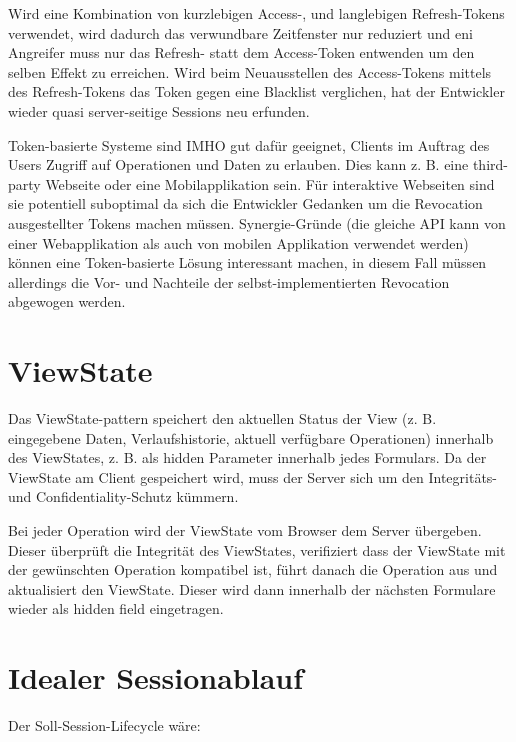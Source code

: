 Wird eine Kombination von kurzlebigen Access-, und langlebigen Refresh-Tokens verwendet, wird dadurch das verwundbare Zeitfenster nur reduziert und eni Angreifer muss nur das Refresh- statt dem Access-Token entwenden um den selben Effekt zu erreichen. Wird beim Neuausstellen des Access-Tokens mittels des Refresh-Tokens das Token gegen eine Blacklist verglichen, hat der Entwickler wieder quasi server-seitige Sessions neu erfunden.

Token-basierte Systeme sind IMHO gut dafür geeignet, Clients im Auftrag des Users Zugriff auf Operationen und Daten zu erlauben. Dies kann z. B. eine third-party Webseite oder eine Mobilapplikation sein. Für interaktive Webseiten sind sie potentiell suboptimal da sich die Entwickler Gedanken um die Revocation ausgestellter Tokens machen müssen. Synergie-Gründe (die gleiche API kann von einer Webapplikation als auch von mobilen Applikation verwendet werden) können eine Token-basierte Lösung interessant machen, in diesem Fall müssen allerdings die Vor- und Nachteile der selbst-implementierten Revocation abgewogen werden.

\section{ViewState}

Das ViewState-pattern speichert den aktuellen Status der View (z. B. eingegebene Daten, Verlaufshistorie, aktuell verfügbare Operationen) innerhalb des ViewStates, z. B. als hidden Parameter innerhalb jedes Formulars. Da der ViewState am Client gespeichert wird, muss der Server sich um den Integritäts- und Confidentiality-Schutz kümmern.

Bei jeder Operation wird der ViewState vom Browser dem Server übergeben. Dieser überprüft die Integrität des ViewStates, verifiziert dass der ViewState mit der gewünschten Operation kompatibel ist, führt danach die Operation aus und aktualisiert den ViewState. Dieser wird dann innerhalb der nächsten Formulare wieder als hidden field eingetragen.


\section{Idealer Sessionablauf}

Der Soll-Session-Lifecycle wäre:


